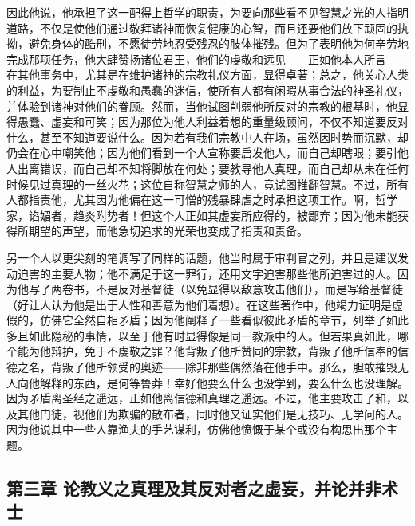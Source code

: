 因此他说，他承担了这一配得上哲学的职责，为要向那些看不见智慧之光的人指明道路，不仅是使他们通过敬拜诸神而恢复健康的心智，而且还要他们放下顽固的执拗，避免身体的酷刑，不愿徒劳地忍受残忍的肢体摧残。但为了表明他为何辛劳地完成那项任务，他大肆赞扬诸位君王，他们的虔敬和远见——正如他本人所言——在其他事务中，尤其是在维护诸神的宗教礼仪方面，显得卓著；总之，他关心人类的利益，为要制止不虔敬和愚蠢的迷信，使所有人都有闲暇从事合法的神圣礼仪，并体验到诸神对他们的眷顾。然而，当他试图削弱他所反对的宗教的根基时，他显得愚蠢、虚妄和可笑；因为那位为他人利益着想的重量级顾问，不仅不知道要反对什么，甚至不知道要说什么。因为若有我们宗教中人在场，虽然因时势而沉默，却仍会在心中嘲笑他；因为他们看到一个人宣称要启发他人，而自己却瞎眼；要引他人出离错误，而自己却不知将脚放在何处；要教导他人真理，而自己却从未在任何时候见过真理的一丝火花；这位自称智慧之师的人，竟试图推翻智慧。不过，所有人都指责他，尤其因为他偏在这一可憎的残暴肆虐之时承担这项工作。啊，哲学家，谄媚者，趋炎附势者！但这个人正如其虚妄所应得的，被鄙弃；因为他未能获得所期望的声望，而他急切追求的光荣也变成了指责和责备。\par

另一个人以更尖刻的笔调写了同样的话题，他当时属于审判官之列，并且是建议发动迫害的主要人物；他不满足于这一罪行，还用文字迫害那些他所迫害过的人。因为他写了两卷书，不是反对基督徒（以免显得以敌意攻击他们），而是写给基督徒（好让人认为他是出于人性和善意为他们着想）。在这些著作中，他竭力证明是虚假的，仿佛它全然自相矛盾；因为他阐释了一些看似彼此矛盾的章节，列举了如此多且如此隐秘的事情，以至于他有时显得像是同一教派中的人。但若果真如此，哪个能为他辩护，免于不虔敬之罪？他背叛了他所赞同的宗教，背叛了他所信奉的信德之名，背叛了他所领受的奥迹——除非那些偶然落在他手中。那么，胆敢摧毁无人向他解释的东西，是何等鲁莽！幸好他要么什么也没学到，要么什么也没理解。因为矛盾离圣经之遥远，正如他离信德和真理之遥远。不过，他主要攻击了和，以及其他门徒，视他们为欺骗的散布者，同时他又证实他们是无技巧、无学问的人。因为他说其中一些人靠渔夫的手艺谋利，仿佛他愤慨于某个或没有构思出那个主题。\par


\subsection{第三章 论教义之真理及其反对者之虚妄，并论并非术士}

